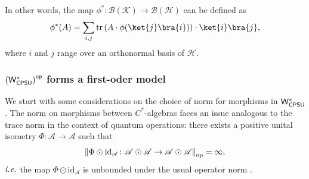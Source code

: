 In other words, the map $\phi^* : \mathcal{B}(\mathcal{K}) \to \mathcal{B}(\mathcal{H})$ can be defined as
\[
\phi^*(A) = \sum_{i,j} \operatorname{tr}\left(A \cdot \phi(\ket{j}\bra{i})\right) \cdot \ket{i}\bra{j},
\]
where \( i \) and \( j \) range over an orthonormal basis of \( \mathcal{H} \). 


\vspace{10pt}

\subsubsection{$\left(\mathsf{W^*_{CPSU}}\right)^{\mathsf{op}}$ forms a first-oder model}




We start with some considerations on the choice of norm for morphisms in $\mathsf{W^*_{CPSU}}$. The norm on morphisms between $C^*$-algebras
faces  an issue analogous to the trace norm in the context of quantum operations:  there exists a positive unital isometry \( \Phi \colon \mathscr{A} \to \mathscr{A} \) such that 
\[
\left\lVert \Phi \odot \mathrm{id}_\mathscr{A} \colon \mathscr{A} \odot \mathscr{A} \to \mathscr{A} \odot \mathscr{A} \right\rVert_{\text{op}} = \infty,
\]
$\emph{i.e.}$ the map $\Phi \odot \mathrm{id}_{\mathscr{A}}$ is unbounded under the usual operator norm 
\cite[Prop.~3.5.2]{brownCalgebrasFinitedimensionalApproximations}.

